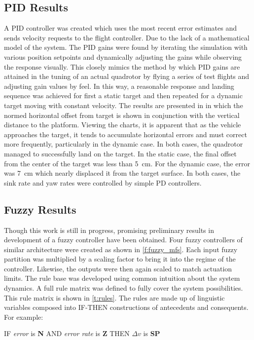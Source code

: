 \subsection{PID Results}
A PID controller was created which uses the most recent error estimates and sends velocity requests to the
flight controller. Due to the lack of a mathematical model of the system. The PID gains were found by
iterating the simulation with various position setpoints and dynamically adjusting the gains while observing
the response visually. This closely mimics the method by which PID gains are attained in the tuning of an
actual quadrotor by flying a series of test flights and adjusting gain values by feel. In this way, a
reasonable response and landing sequence was achieved for first a static target and then repeated for a
dynamic target moving with constant velocity. The results are presented in 
in which the normed horizontal offset from target is shown in conjunction with the vertical distance to the
platform. Viewing the charts, it is apparent that as the vehicle approaches the target, it tends to accumulate
horizontal errors and must correct more frequently, particularly in the dynamic case. In both cases, the
quadrotor managed to successfully land on the target. In the static case, the final offset from the center of
the target was less than \SI{5}{\cm}. For the dynamic case, the error was \SI{7}{\cm} which nearly displaced
it from the target surface. In both cases, the sink rate and yaw rates were controlled by simple PD
controllers.



\subsection{Fuzzy Results}
Though this work is still in progress, promising preliminary results in development of a fuzzy controller have
been obtained. Four fuzzy controllers of similar architecture were created as shown in \cref{f:fuzzy_mfs}.
Each input fuzzy partition was multiplied by a scaling factor to bring it into the regime of the controller.
Likewise, the outputs were then again scaled to match actuation limits. The rule base was developed using
common intuition about the system dynamics. A full rule matrix was defined to fully cover the system
possibilities. This rule matrix is shown in \cref{t:rules}. The rules are made up of linguistic variables
composed into IF-THEN constructions of antecedents and consequents. For example:
\begin{center}
    IF \emph{error} is \textbf{N} AND \emph{error rate} is \textbf{Z} THEN \emph{$\Delta v$} is \textbf{SP}
\end{center}

